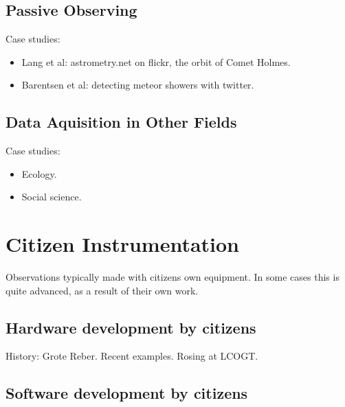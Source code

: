 \documentclass{ar2e}
\begin{document}
\subsection{Passive Observing}
\label{sec:observers:passive}

Case studies:
\begin{itemize}
\item Lang et al: astrometry.net on flickr, the orbit of Comet Holmes.
\item Barentsen et al: detecting meteor showers with twitter.
\end{itemize}


\subsection{Data Aquisition in Other Fields}
\label{sec:observers:non-astro}

Case studies:
\begin{itemize}
\item Ecology.
\item Social science.
\end{itemize}



\section{Citizen Instrumentation}
\label{sec:builders}

Observations typically made with citizens own equipment. In some cases this is
quite advanced, as a result of their own work. 


\subsection{Hardware development by citizens}
\label{sec:builders:hardware}

History: Grote Reber. Recent examples. Rosing at LCOGT.


\subsection{Software development by citizens}
\label{sec:builders:software}
\end{document}
